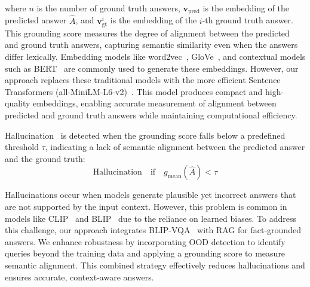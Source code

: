 where \( n \) is the number of ground truth answers, \( \mathbf{v}_{\text{pred}} \) is the embedding of the predicted answer \( \hat{A} \), and \( \mathbf{v}_{\text{gt}}^i \) is the embedding of the \( i \)-th ground truth answer. This grounding score measures the degree of alignment between the predicted and ground truth answers, capturing semantic similarity even when the answers differ lexically. Embedding models like word2vec~\cite{mikolov2013efficient}, GloVe~\cite{pennington2014glove}, and contextual models such as BERT~\cite{devlin2018bert} are commonly used to generate these embeddings. However, our approach replaces these traditional models with the more efficient Sentence Transformers (all-MiniLM-L6-v2)~\cite{reimers2019sentence}. This model produces compact and high-quality embeddings, enabling accurate measurement of alignment between predicted and ground truth answers while maintaining computational efficiency.   

Hallucination~\cite{zhou2020detecting, maynez2020faithfulness} is detected when the grounding score falls below a predefined threshold \( \tau \), indicating a lack of semantic alignment between the predicted answer and the ground truth:
\begin{equation}
\text{Hallucination} \quad \text{if} \quad g_{\text{mean}}(\hat{A}) < \tau
\end{equation}

Hallucinations occur when models generate plausible yet incorrect answers that are not supported by the input context. However, this problem is common in models like CLIP~\cite{radford2021learning} and BLIP~\cite{li2022blip} due to the reliance on learned biases. To address this challenge, our approach integrates BLIP-VQA~\cite{li2022blip} with RAG for fact-grounded answers. We enhance robustness by incorporating OOD detection to identify queries beyond the training data and applying a grounding score to measure semantic alignment. This combined strategy effectively reduces hallucinations and ensures accurate, context-aware answers.


